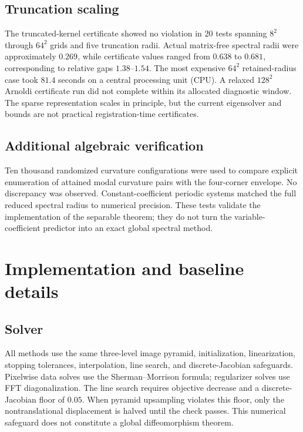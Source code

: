 \documentclass[11pt]{article}
\begin{document}
\subsection{Truncation scaling}
The truncated-kernel certificate showed no violation in 20 tests spanning
$8^2$ through $64^2$ grids and five truncation radii. Actual matrix-free
spectral radii were approximately $0.269$, while certificate values ranged from
$0.638$ to $0.681$, corresponding to relative gaps $1.38$--$1.54$. The most
expensive $64^2$ retained-radius case took $81.4$ seconds on a central
processing unit (CPU). A relaxed
$128^2$ Arnoldi certificate run did not complete within its allocated
diagnostic window. The sparse representation scales in principle, but the
current eigensolver and bounds are not practical registration-time
certificates.

\subsection{Additional algebraic verification}
Ten thousand randomized curvature configurations were used to compare explicit
enumeration of attained modal curvature pairs with the four-corner envelope.
No discrepancy was observed. Constant-coefficient periodic systems matched the full reduced
spectral radius to numerical precision. These tests validate the implementation
of the separable theorem; they do not turn the variable-coefficient predictor
into an exact global spectral method.

\section{Implementation and baseline details}\label{sec:implementation}
\subsection{Solver}
All methods use the same three-level image pyramid, initialization,
linearization, stopping tolerances, interpolation, line search, and
discrete-Jacobian safeguards. Pixelwise data solves use the
Sherman--Morrison formula; regularizer solves use FFT diagonalization. The line
search requires objective decrease and a discrete-Jacobian floor of $0.05$.
When pyramid upsampling violates this floor, only the nontranslational
displacement is halved until the check passes. This numerical safeguard does
not constitute a global diffeomorphism theorem.
\end{document}
